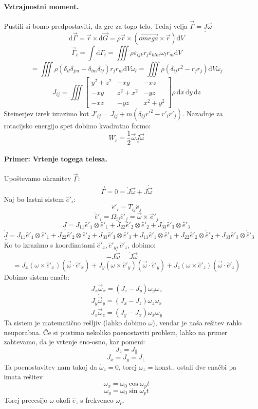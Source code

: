 \documentclass[a4paper]{article}
\newcommand{\vct}[1]{\overrightarrow{#1}}
\newcommand{\dif}{\mathrm{d}}
\newcommand{\dunderline}[1]{\underline{\underline{#1}}}
\begin{document}
\paragraph{Vztrajnostni moment.} Pustili si bomo predpostaviti, da gre za togo telo. Tedaj velja $\vct{\Gamma} = \dunderline{J}\vct{\omega}$
$$\dif\vct{\Gamma} = \vct{r} \times \dif\vct{G} = \rho \vct{r} \times (\vct{omega} \times \vct{r}) \dif V$$
$$\vct{\Gamma}_i = \int \dif\Gamma_i = \iiint \rho \varepsilon_{ijk}r_j\varepsilon_{klm} \omega_l r_m \dif V$$
$$ = \iiint \rho (\delta_{il}\delta_{jm} - \delta_{im}\delta_{lj})r_jr_m\dif V\omega_l = \iiint\rho(\delta_{ij}r^2-r_jr_j)\dif V \omega_j$$
$$J_{ij} = \iiint \begin{bmatrix}
    y^2 + z^2 & -xy & -xz \\
    -xy & z^2 + x^2 & -yz \\
    -xz & -yz & x^2 + y^2
\end{bmatrix} \rho \, \dif x \, \dif y \, \dif z$$
Steinerjev izrek izrazimo kot $\displaystyle{J'_{ij} = J_{ij} + m\left(\delta_{ij} r'^2 - r'_i r'_j\right)}$. Nazadnje za rotacijsko energijo spet dobimo kvadratno formo:
$$W_r = \frac{1}{2}\vct{\omega} \dunderline{J} \vct{\omega}$$
\paragraph{Primer: Vrtenje togega telesa.} Upoštevamo ohranitev $\vct{\Gamma}$:
$$\dot{\vct{\Gamma}} = 0 = \dot{J}\vct{\omega} + J\dot{\vct{\omega}}$$
Naj bo lastni sistem $\hat{e}'_i$:
$$\hat{e}'_i = T_{ij}\hat{e}_j$$
$$\dot{\hat{e}}'_i = \Omega_{ij}\hat{e}'_j = \vct{\omega}\times\vct{e}'_j$$
$$\dunderline{J} = J_{11}\hat{e}'_1\otimes\hat{e}'_1 + J_{22}\hat{e}'_2\otimes\hat{e}'_2 + J_{33}\hat{e}'_3\otimes\hat{e}'_3$$
$$\dunderline{\dot{J}} = J_{11}\dot{\hat{e}}'_1\otimes\hat{e}'_1 + J_{22}\dot{\hat{e}}'_2\otimes\hat{e}'_2 + J_{33}\dot{\hat{e}}'_3\otimes\hat{e}'_3 + J_{11}\hat{e}'_1\otimes\dot{\hat{e}}'_1 + J_{22}\hat{e}'_2\otimes\dot{\hat{e}}'_2 + J_{33}\hat{e}'_3\otimes\dot{\hat{e}}'_3$$
Ko to izrazimo s koordinatami $\hat{e}'_x, \hat{e}'_y, \hat{e}'_z$, dobimo:
$$-J\dot{\vct{\omega}} = \dot{J}\vct{\omega} =$$
$$= J_x (\omega \times \hat{e}'_x)(\vct{\omega} \cdot \hat{e}'_x) + J_y (\omega \times \hat{e}'_y)(\vct{\omega} \cdot \hat{e}'_y) + J_z (\omega \times \hat{e}'_z)(\vct{\omega} \cdot \hat{e}'_z)$$
Dobimo sistem enačb:
$$J_x\dot{\vct{\omega}}_x = \left(J_z - J_y\right)\omega_y\omega_z$$
$$J_y\dot{\vct{\omega}}_y = \left(J_x - J_z\right)\omega_z\omega_x$$
$$J_x\dot{\vct{\omega}}_z = \left(J_y - J_x\right)\omega_x\omega_y$$
Ta sistem je matematično rešljiv (lahko dobimo $\omega$), vendar je naša rešitev rahlo neuporabna. Če si pustimo nekoliko poenostaviti problem, lahko na primer zahtevamo, da je vrtenje eno-osno, kar pomeni:
$$J_z = J_\parallel$$
$$J_x = J_y = J_\perp$$
Ta poenostavitev nam takoj da $\dot{\omega}_z = 0$, torej $\omega_z = \text{konst.}$, ostali dve enačbi pa imata rešitev
$$\omega_x = \omega_0 \cos\omega_pt$$
$$\omega_y = \omega_0 \sin\omega_pt$$
Torej precesijo $\omega$ okoli $\hat{e}_z$ s frekvenco $\omega_p$.
\end{document}
